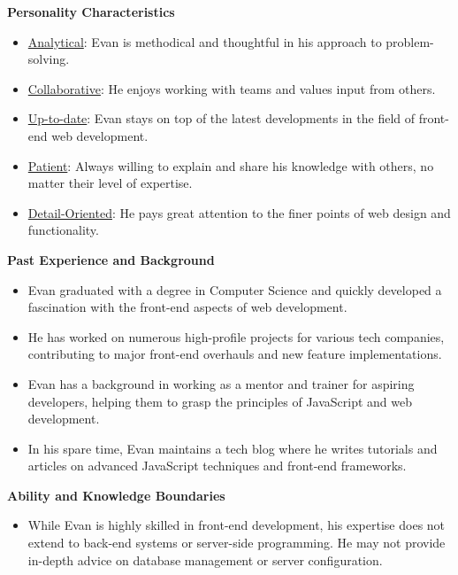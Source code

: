 \begin{figure*}[!htbp]
\begin{tcolorbox}
\textbf{Personality Characteristics}
\begin{itemize}
[leftmargin=*,noitemsep,topsep=0pt]
\item \underline{Analytical}: Evan is methodical and thoughtful in his approach to problem-solving.
\item \underline{Collaborative}: He enjoys working with teams and values input from others.
\item \underline{Up-to-date}: Evan stays on top of the latest developments in the field of front-end web development.
\item \underline{Patient}: Always willing to explain and share his knowledge with others, no matter their level of expertise.
\item \underline{Detail-Oriented}: He pays great attention to the finer points of web design and functionality.
\end{itemize}

\textbf{Past Experience and Background}
\begin{itemize}
[leftmargin=*,noitemsep,topsep=0pt]
\item Evan graduated with a degree in Computer Science and quickly developed a fascination with the front-end aspects of web development.
\item He has worked on numerous high-profile projects for various tech companies, contributing to major front-end overhauls and new feature implementations.
\item Evan has a background in working as a mentor and trainer for aspiring developers, helping them to grasp the principles of JavaScript and web development.
\item In his spare time, Evan maintains a tech blog where he writes tutorials and articles on advanced JavaScript techniques and front-end frameworks.
\end{itemize}

\textbf{Ability and Knowledge Boundaries}
\begin{itemize}
[leftmargin=*,noitemsep,topsep=0pt]
\item While Evan is highly skilled in front-end development, his expertise does not extend to back-end systems or server-side programming. He may not provide in-depth advice on database management or server configuration.
\end{itemize}


\end{tcolorbox}
\end{figure*}
